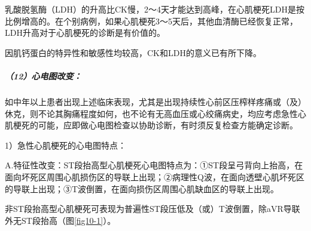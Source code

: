 乳酸脱氢酶（LDH）的升高比CK慢，2～4天才能达到高峰，在心肌梗死LDH是按比例增高的。在个别病例，如果心肌梗死3～5天后，其他血清酶已经恢复正常，LDH升高对于心肌梗死的诊断是有价值的。

因肌钙蛋白的特异性和敏感性均较高，CK和LDH的意义已有所下降。

\subparagraph{（12）心电图改变：}

如中年以上患者出现上述临床表现，尤其是出现持续性心前区压榨样疼痛或（及）休克，则不论其胸痛程度如何，也不论有无高血压或心绞痛病史，均应考虑急性心肌梗死的可能，应即做心电图检查以协助诊断，有时须反复检查方能确定诊断。

1）急性心肌梗死的心电图特点：

A.特征性改变：ST段抬高型心肌梗死心电图特点为：①ST段呈弓背向上抬高，在面向坏死区周围心肌损伤区的导联上出现；②病理性Q波，在面向透壁心肌坏死区的导联上出现；③T波倒置，在面向损伤区周围心肌缺血区的导联上出现。

非ST段抬高型心肌梗死可表现为普遍性ST段压低及（或）T波倒置，除aVR导联外无ST段抬高（图\ref{fig10-1}）。



